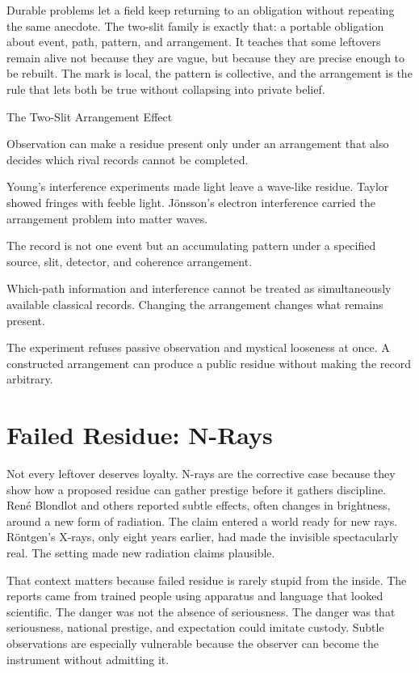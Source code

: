 Durable problems let a field keep returning to an obligation without
repeating the same anecdote. The two-slit family is exactly that: a portable
obligation about event, path, pattern, and arrangement. It teaches that some
leftovers remain alive not because they are vague, but because they are
precise enough to be rebuilt. The mark is local, the pattern is collective,
and the arrangement is the rule that lets both be true without collapsing
into private belief.

\begin{phenom}{The Two-Slit Arrangement Effect~\cite{young1804,taylor1909,jonsson1961}}
\label{ph:two-slit-arrangement}

\PhStatement
Observation can make a residue present only under an arrangement that also
decides which rival records cannot be completed.

\PhOrigin
Young's interference experiments made light leave a wave-like residue. Taylor
showed fringes with feeble light. J\"onsson's electron interference carried the
arrangement problem into matter waves.

\PhObservation
The record is not one event but an accumulating pattern under a specified
source, slit, detector, and coherence arrangement.

\PhConstraint
Which-path information and interference cannot be treated as simultaneously
available classical records. Changing the arrangement changes what remains
present.

\PhConsequence
The experiment refuses passive observation and mystical looseness at once. A
constructed arrangement can produce a public residue without making the record
arbitrary.
\end{phenom}

\section{Failed Residue: N-Rays}

Not every leftover deserves loyalty. N-rays are the corrective case because
they show how a proposed residue can gather prestige before it gathers
discipline. Ren\'e Blondlot and others reported subtle effects, often
changes in brightness, around a new form of radiation. The claim entered a
world ready for new rays. R\"ontgen's X-rays, only eight years earlier, had
made the invisible spectacularly real. The setting made new radiation claims
plausible.

That context matters because failed residue is rarely stupid from the
inside. The reports came from trained people using apparatus and language
that looked scientific. The danger was not the absence of seriousness. The
danger was that seriousness, national prestige, and expectation could
imitate custody. Subtle observations are especially vulnerable because the
observer can become the instrument without admitting it.

